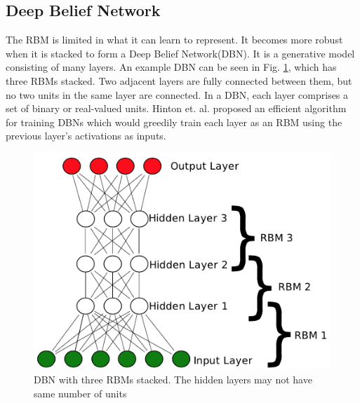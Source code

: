 \documentclass[letterpaper, 10 pt, conference]{ieeeconf}
\begin{document}
\subsection{Deep Belief Network}
The RBM is limited in what it can learn to represent. It becomes more robust when it is stacked to form a Deep Belief Network(DBN). It is a generative model consisting of many layers. An example DBN can be seen in Fig. \ref{fig:dbn}, which has three RBMs stacked. Two adjacent layers are fully connected between them, but no two units in the same layer are connected. In a DBN, each layer comprises a set of binary or real-valued units. Hinton et. al.\cite{c13} proposed an efficient algorithm for training DBNs which would greedily train each layer as an RBM using the previous layer's activations as inputs.
\begin{figure}[thpb]
      \centering
      \includegraphics[scale=0.65]{dbn.png}
      \caption{DBN with three RBMs stacked. The hidden layers may not have same number of units}
      \label{fig:dbn}
\end{figure}

\end{document}
